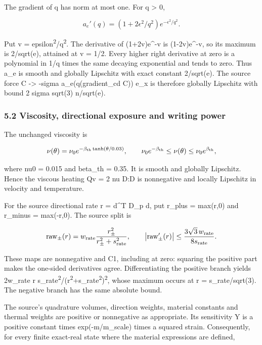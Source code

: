 \documentclass[11pt,a4paper]{article}
\begin{document}
The gradient of q has norm at most one. For q > 0,



\[
a_e'(q)=(1+2\epsilon^2/q^2)e^{-\epsilon^2/q^2}.
\]



Put v = epsilon\textsuperscript{2}/q\textsuperscript{2}. The derivative of (1+2v)e^-v is (1-2v)e^-v, so its maximum is 2/sqrt(e), attained at v = 1/2. Every higher right derivative at zero is a polynomial in 1/q times the same decaying exponential and tends to zero. Thus a\_e is smooth and globally Lipschitz with exact constant 2/sqrt(e). The source force C -> -sigma a\_e(q(gradient\_cd C)) e\_x is therefore globally Lipschitz with bound 2 sigma sqrt(3) n/sqrt(e).

\subsubsection*{5.2 Viscosity, directional exposure and writing power}

The unchanged viscosity is



\[
\nu(\theta)=\nu_0e^{-\beta_{\rm th}\tanh(\theta/0.03)},
\qquad
\nu_0e^{-\beta_{\rm th}}\le\nu(\theta)\le\nu_0e^{\beta_{\rm th}},
\]



where nu0 = 0.015 and beta\_th = 0.35. It is smooth and globally Lipschitz. Hence the viscous heating Qv = 2 nu D:D is nonnegative and locally Lipschitz in velocity and temperature.

For the source directional rate r = d^T D\_p d, put r\_plus = max(r,0) and r\_minus = max(-r,0). The source split is



\[
\operatorname{raw}_{\pm}(r)
=w_{\rm rate}\frac{r_{\pm}^2}{r_{\pm}^2+s_{\rm rate}^2},
\qquad
\left|\operatorname{raw}_{\pm}'(r)\right|
\le\frac{3\sqrt3\,w_{\rm rate}}{8s_{\rm rate}}.
\]



These maps are nonnegative and C1, including at zero: squaring the positive part makes the one-sided derivatives agree. Differentiating the positive branch yields 2w\_rate r s\_rate\textsuperscript{2}/(r\textsuperscript{2}+s\_rate\textsuperscript{2})\textsuperscript{2}, whose maximum occurs at r = s\_rate/sqrt(3). The negative branch has the same absolute bound.

The source's quadrature volumes, direction weights, material constants and thermal weights are positive or nonnegative as appropriate. Its sensitivity Y is a positive constant times exp(-m/m\_scale) times a squared strain. Consequently, for every finite exact-real state where the material expressions are defined,
\end{document}
